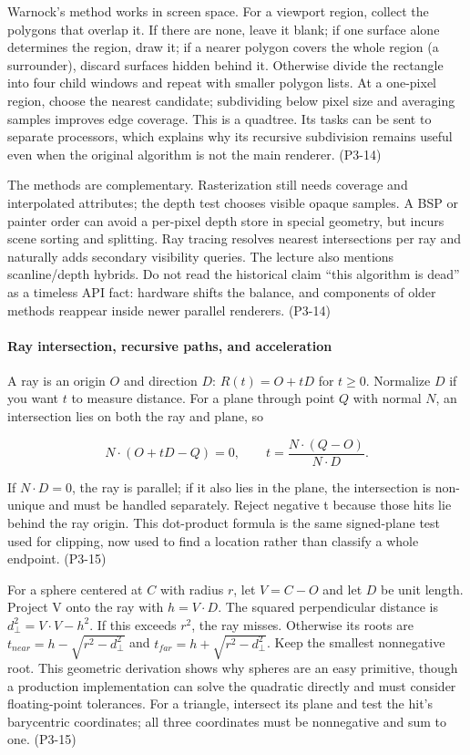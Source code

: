 Warnock's method works in screen space. For a viewport region, collect the polygons that overlap it. If there are none, leave it blank; if one surface alone determines the region, draw it; if a nearer polygon covers the whole region (a surrounder), discard surfaces hidden behind it. Otherwise divide the rectangle into four child windows and repeat with smaller polygon lists. At a one-pixel region, choose the nearest candidate; subdividing below pixel size and averaging samples improves edge coverage. This is a quadtree. Its tasks can be sent to separate processors, which explains why its recursive subdivision remains useful even when the original algorithm is not the main renderer. (P3-14)

The methods are complementary. Rasterization still needs coverage and interpolated attributes; the depth test chooses visible opaque samples. A BSP or painter order can avoid a per-pixel depth store in special geometry, but incurs scene sorting and splitting. Ray tracing resolves nearest intersections per ray and naturally adds secondary visibility queries. The lecture also mentions scanline/depth hybrids. Do not read the historical claim ``this algorithm is dead'' as a timeless API fact: hardware shifts the balance, and components of older methods reappear inside newer parallel renderers. (P3-14)

\paragraph{Ray intersection, recursive paths, and acceleration}\label{ray-intersection-recursive-paths-and-acceleration}

A ray is an origin \(O\) and direction \(D\): \(R(t)=O+tD\) for \(t\ge0\). Normalize \(D\) if you want \(t\) to measure distance. For a plane through point \(Q\) with normal \(N\), an intersection lies on both the ray and plane, so

\[
N\cdot(O+tD-Q)=0,\qquad t=\frac{N\cdot(Q-O)}{N\cdot D}.
\]

If \(N\cdot D=0\), the ray is parallel; if it also lies in the plane, the intersection is non-unique and must be handled separately. Reject negative t because those hits lie behind the ray origin. This dot-product formula is the same signed-plane test used for clipping, now used to find a location rather than classify a whole endpoint. (P3-15)

For a sphere centered at \(C\) with radius \(r\), let \(V=C-O\) and let \(D\) be unit length. Project V onto the ray with \(h=V\cdot D\). The squared perpendicular distance is \(d_\perp^2=V\cdot V-h^2\). If this exceeds \(r^2\), the ray misses. Otherwise its roots are \(t_{near}=h-\sqrt{r^2-d_\perp^2}\) and \(t_{far}=h+\sqrt{r^2-d_\perp^2}\). Keep the smallest nonnegative root. This geometric derivation shows why spheres are an easy primitive, though a production implementation can solve the quadratic directly and must consider floating-point tolerances. For a triangle, intersect its plane and test the hit's barycentric coordinates; all three coordinates must be nonnegative and sum to one. (P3-15)

